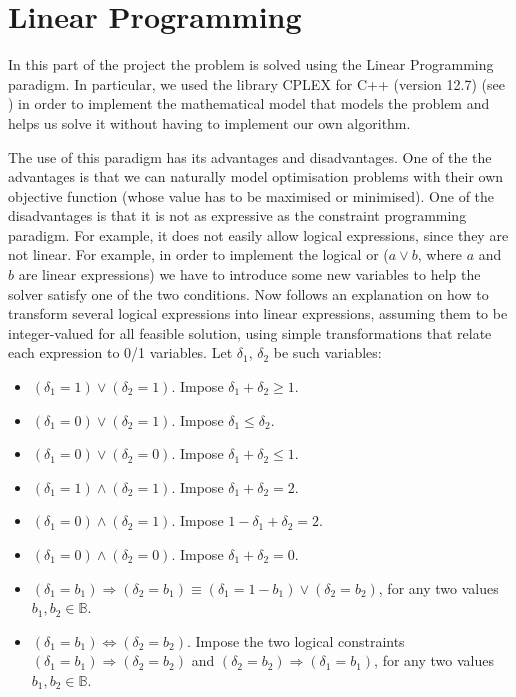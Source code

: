 \section{Linear Programming}
\label{sec:linear-programming}

In this part of the project the problem is solved using the Linear Programming
paradigm. In particular, we used the library CPLEX for C++ (version 12.7)
(see \cite{CplexWEB}) in order to implement the mathematical model that models
the problem and helps us solve it without having to implement our own algorithm.

\hfill

The use of this paradigm has its advantages and disadvantages.
One of the the advantages is that we can naturally model optimisation problems
with their own objective function (whose value has to be maximised or minimised).
One of the disadvantages is that it is not as expressive as the constraint
programming paradigm. For example, it does not easily allow logical expressions,
since they are not linear. For example, in order to implement the
logical or ($a \vee b$, where $a$ and $b$ are linear expressions) we have to
introduce some new variables to help the solver satisfy one of the two conditions.
Now follows an explanation on how to transform several logical expressions into
linear expressions, assuming them to be integer-valued for all feasible solution,
using simple transformations that relate each expression to 0/1 variables. Let
$\delta_1$, $\delta_2$ be such variables:

\begin{itemize}	
	\item $(\delta_1 = 1) \vee (\delta_2 = 1)$. Impose $\delta_1 + \delta_2 \ge 1$.
	
	\item $(\delta_1 = 0) \vee (\delta_2 = 1)$.	Impose $\delta_1 \le \delta_2$.
	
	\item $(\delta_1 = 0) \vee (\delta_2 = 0)$.	Impose $\delta_1 + \delta_2 \le 1$.
	
	\item $(\delta_1 = 1) \wedge (\delta_2 = 1)$. Impose $\delta_1 + \delta_2 = 2$.
	
	\item $(\delta_1 = 0) \wedge (\delta_2 = 1)$. Impose $1 - \delta_1 + \delta_2 = 2$.	
	
	\item $(\delta_1 = 0) \wedge (\delta_2 = 0)$. Impose $\delta_1 + \delta_2 = 0$.
	
	\item $(\delta_1 = b_1) \Longrightarrow (\delta_2 = b_1) \equiv (\delta_1 = 1 - b_1) \vee (\delta_2 = b_2)$,
	for any two values $b_1,b_2 \in \mathbb{B}$.
	
	\item $(\delta_1 = b_1) \Longleftrightarrow (\delta_2 = b_2)$. Impose the two logical constraints
	$(\delta_1 = b_1) \Longrightarrow (\delta_2 = b_2)$ and $(\delta_2 = b_2) \Longrightarrow (\delta_1 = b_1)$,
	for any two values $b_1,b_2 \in \mathbb{B}$.
	
\end{itemize}

